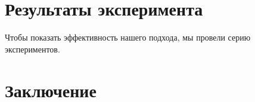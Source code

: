 \documentclass[12pt,a4paper,oneside]{article}
\theoremstyle{definition}
\theoremstyle{lemma}
\theoremstyle{remark}
\begin{document}
\cleardoublepage
\section{Результаты эксперимента}\label{sec:experimentalresults}

Чтобы показать эффективность нашего подхода, мы провели серию экспериментов.


\cleardoublepage
\section{Заключение}\label{sec:conclusion}


%
%
\newpage


\end{document}
